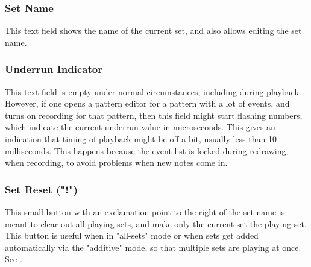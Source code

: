 \subsubsection{Set Name}
\label{subsubsec:introduction_set_name}

   This text field shows the name of the current set, and also allows editing
   the set name.

\subsubsection{Underrun Indicator}
\label{subsubsec:introduction_underrun_indicator}

   This text field is empty under normal circumstances, including during
   playback.  However, if one opens a pattern editor for a pattern with a lot
   of events, and turns on recording for that pattern, then this field might
   start flashing numbers, which indicate the
   current underrun value in microseconds.  This gives an indication that
   timing of playback might be off a bit, usually less than 10 milliseconds.
   This happens because the event-list is locked during redrawing,
   when recording, to avoid problems when new notes come in.

\subsubsection{Set Reset ("!")}
\label{subsubsec:introduction_set_reset}

   This small button with an exclamation point
   to the right of the set name is meant to clear
   out all playing sets, and make only the current set the playing set.
   This button is useful when in "all-sets" mode or when sets get added
   automatically via the "additive" mode, so that multiple sets are playing
   at once.
   See .

\begin{comment}


\subsubsection{Set Master Button}
\label{subsubsec:introduction_set_master_button}

   This button brings up an external window showing the \textbf{Set Master}
   panel.  This panel is also available in a center tab.  It is a work in
   progress, and doesn't have a whole lot of functionality yet.
   It can currently show existing sets in one view, and allow
   reordering the sets.

\end{comment}


